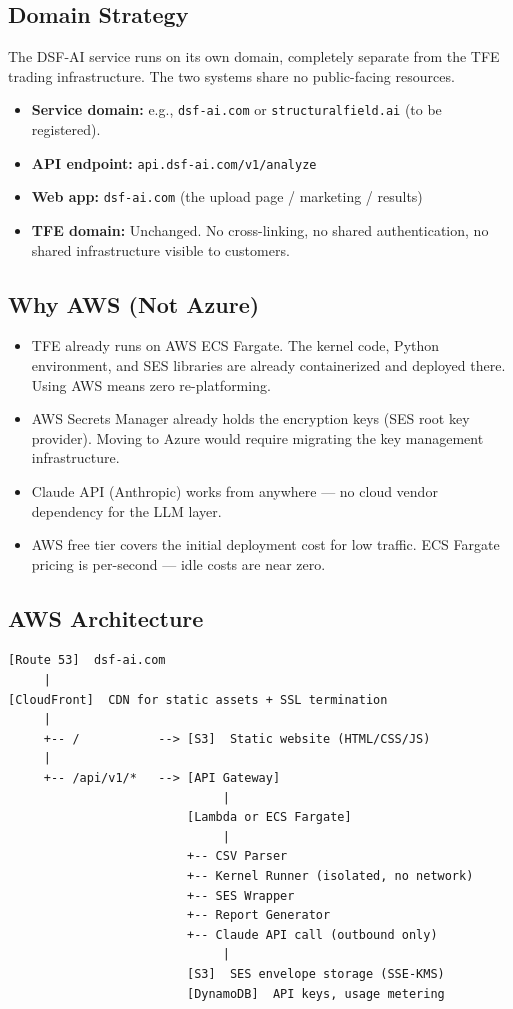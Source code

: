 \documentclass[11pt,letterpaper]{article}
\begin{document}
\subsection{Domain Strategy}

The DSF-AI service runs on its own domain, completely separate from
the TFE trading infrastructure. The two systems share no public-facing
resources.

\begin{itemize}
  \item \textbf{Service domain:} e.g., \texttt{dsf-ai.com} or
    \texttt{structuralfield.ai} (to be registered).
  \item \textbf{API endpoint:} \texttt{api.dsf-ai.com/v1/analyze}
  \item \textbf{Web app:} \texttt{dsf-ai.com} (the upload page /
    marketing / results)
  \item \textbf{TFE domain:} Unchanged. No cross-linking, no shared
    authentication, no shared infrastructure visible to customers.
\end{itemize}

\subsection{Why AWS (Not Azure)}

\begin{itemize}
  \item TFE already runs on AWS ECS Fargate. The kernel code, Python
    environment, and SES libraries are already containerized and
    deployed there. Using AWS means zero re-platforming.
  \item AWS Secrets Manager already holds the encryption keys (SES
    root key provider). Moving to Azure would require migrating the
    key management infrastructure.
  \item Claude API (Anthropic) works from anywhere --- no cloud
    vendor dependency for the LLM layer.
  \item AWS free tier covers the initial deployment cost for low
    traffic. ECS Fargate pricing is per-second --- idle costs are
    near zero.
\end{itemize}

\subsection{AWS Architecture}

\begin{verbatim}
[Route 53]  dsf-ai.com
     |
[CloudFront]  CDN for static assets + SSL termination
     |
     +-- /           --> [S3]  Static website (HTML/CSS/JS)
     |
     +-- /api/v1/*   --> [API Gateway]
                              |
                         [Lambda or ECS Fargate]
                              |
                         +-- CSV Parser
                         +-- Kernel Runner (isolated, no network)
                         +-- SES Wrapper
                         +-- Report Generator
                         +-- Claude API call (outbound only)
                              |
                         [S3]  SES envelope storage (SSE-KMS)
                         [DynamoDB]  API keys, usage metering
\end{verbatim}
\end{document}

